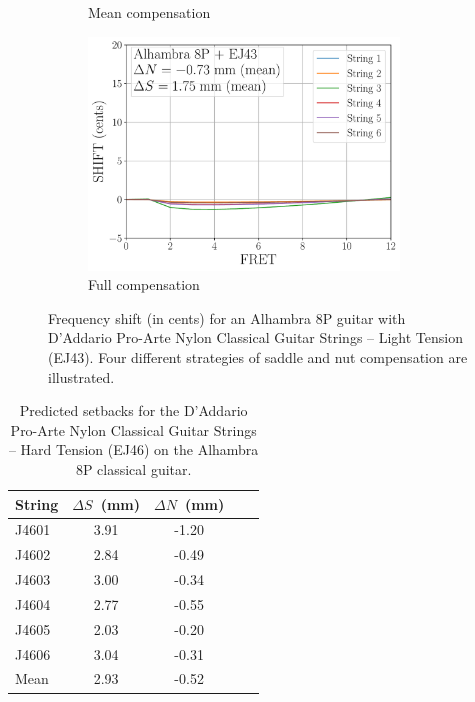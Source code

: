 \begin{figure}
\begin{subfigure}[b]{0.45\textwidth}
   \caption{Mean compensation}
   \label{fig:shift_alhambra8p_ej43_mean}
  \end{subfigure}
  \hspace{0.25in}
  \begin{subfigure}[b]{0.45\textwidth}
   \centering
   \includegraphics[width=3.25in]{figures/shift_alhambra8p_ej43_full}
   \caption{Full compensation}
   \label{fig:shift_alhambra8p_ej43_full}
  \end{subfigure}
  \caption{\label{fig:compensation} Frequency shift (in cents) for an Alhambra 8P guitar with D'Addario Pro-Arte Nylon Classical Guitar Strings -- Light Tension (EJ43). Four different strategies of saddle and nut compensation are illustrated.}
 \end{figure}


\begin{table}%
  \centering
  \caption{\label{tbl:ej46_setbacks} Predicted setbacks for the D'Addario Pro-Arte Nylon Classical Guitar Strings -- Hard Tension (EJ46) on the Alhambra 8P classical guitar.}
    \begin{tabular}{lcccc}
    \hline \hline
    String  & $\Delta S$~(mm) & $\Delta N$~(mm) \\
    \hline
    J4601 & 3.91 & -1.20 \\
    J4602 & 2.84 & -0.49 \\
    J4603 & 3.00 & -0.34 \\
    J4604 & 2.77 & -0.55 \\
    J4605 & 2.03 & -0.20 \\
    J4606 & 3.04 & -0.31 \\
    \hline \hline
    Mean & 2.93 & -0.52 \\
    \hline
    \end{tabular}%
  \label{tab:addlabel}%
\end{table}%


